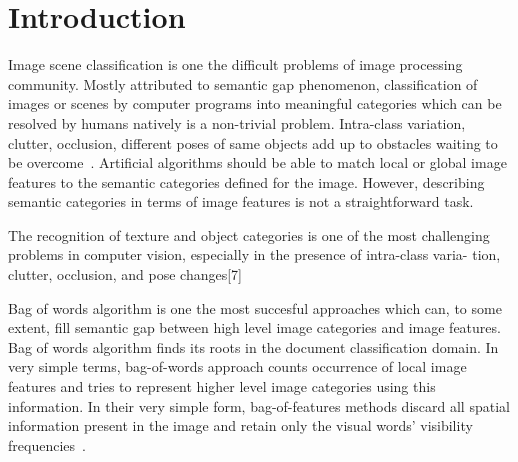 \documentclass[conference]{IEEEtran}
\begin{document}


%
\IEEEpeerreviewmaketitle

\IEEEpubidadjcol

\section{Introduction}

Image scene classification is one the difficult problems of image processing community. Mostly attributed to semantic gap phenomenon, classification of images or scenes by computer programs into meaningful categories which can be resolved by humans natively is a non-trivial problem. Intra-class variation, clutter, occlusion, different poses of same objects add up to obstacles waiting to be overcome~\cite{LocalFeaturesAndKernels}. Artificial algorithms  should be able to match local or global image features to the semantic categories defined for the image. However, describing semantic categories in terms of image features is not a straightforward task.

The recognition of texture and object categories is one of the most challenging problems in computer vision, especially in the presence of intra-class varia- tion, clutter, occlusion, and pose changes[7]

Bag of words algorithm is one the most succesful approaches which can, to some extent, fill semantic gap between high level image categories and image features. Bag of words algorithm finds its roots in the document classification domain. In very simple terms, bag-of-words approach counts occurrence of local image features and tries to represent higher level image categories using this information. In their very simple form, bag-of-features methods discard all spatial information present in the image and retain only the visual words' visibility frequencies~\cite{LocalFeaturesAndKernels}.
\end{document}
